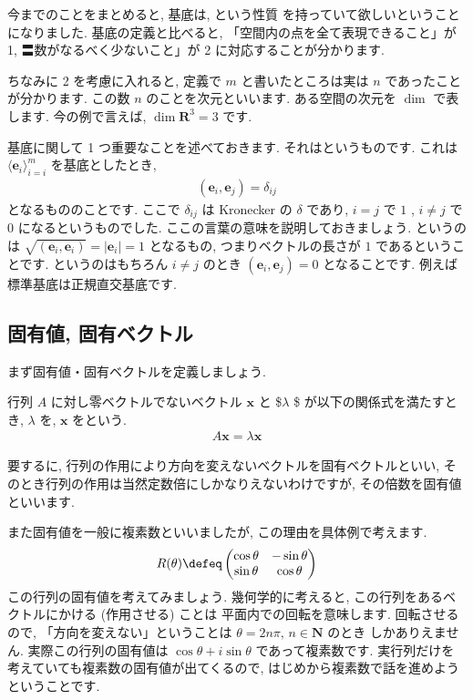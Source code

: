 \documentclass[openany, a4paper, oneside]{jsbook}
\begin{document}
今までのことをまとめると, 基底は, という性質
を持っていて欲しいということになりました. 基底の定義と比べると, 「空間内の点を全て表現できること」が 1,
〓数がなるべく少ないこと」が 2 に対応することが分かります.

ちなみに 2 を考慮に入れると, 定義で $m$ と書いたところは実は $n$ であったことが分かります.
この数 $n$ のことを次元といいます.
ある空間の次元を $\dim$ で表します. 今の例で言えば,  $\dim \bm{R}^3 =3$ です.

基底に関して 1 つ重要なことを述べておきます. それはというものです.
これは $\langle \bm{e}_{i} \rangle_{i=i}^m$ を基底としたとき,
\begin{align}
    (\bm{e}_{i},\bm{e}_{j}) = \delta _{ij}
\end{align}
となるもののことです. ここで $\delta _{ij}$ は Kronecker の $\delta$ であり,  $i=j$ で $1$ ,  $i \not = j$ で $0$ になるというものでした.
ここの言葉の意味を説明しておきましょう. というのは $\sqrt{(\bm{e}_{i},\bm{e}_{i})}=\mid \bm{e}_{i} \mid = 1$
となるもの, つまりベクトルの長さが $1$ であるということです. というのはもちろん $i\not = j$ のとき
 $(\bm{e}_{i},\bm{e}_{j})=0$ となることです. 例えば標準基底は正規直交基底です.
\subsection{固有値, 固有ベクトル \label{eigen}}

まず固有値・固有ベクトルを定義しましょう.
    \begin{defn}行列 $A$ に対し零ベクトルでないベクトル $\bm{x}$ と \$$\lambda$ \$
が以下の関係式を満たすとき,  $\lambda$ を,
 $\bm{x}$ をという.
\begin{align}
    A \bm{x} = \lambda \bm{x}
\end{align}
    \end{defn}
要するに, 行列の作用により方向を変えないベクトルを固有ベクトルといい,
そのとき行列の作用は当然定数倍にしかなりえないわけですが, その倍数を固有値といいます.

また固有値を一般に複素数といいましたが, この理由を具体例で考えます.
\begin{align}
    R (\theta ) \defeq      \begin{pmatrix} \cos \theta & - \sin \theta \\
                    \sin \theta & \cos \theta
    \end{pmatrix}
\end{align}
この行列の固有値を考えてみましょう. 幾何学的に考えると, この行列をあるベクトルにかける (作用させる) ことは
平面内での回転を意味します. 回転させるので, 「方向を変えない」ということは $\theta = 2n \pi , \, n \in \bm{N}$ のとき
しかありえません. 実際この行列の固有値は $\cos \theta + i \sin \theta$ であって複素数です.
実行列だけを考えていても複素数の固有値が出てくるので, はじめから複素数で話を進めようということです.
\end{document}
